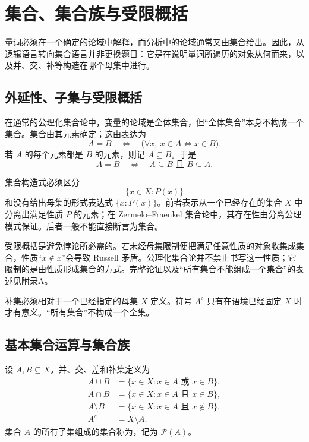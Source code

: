 \section{集合、集合族与受限概括}

量词必须在一个确定的论域中解释，而分析中的论域通常又由集合给出。因此，从逻辑语言转向集合语言并非更换题目：它是在说明量词所遍历的对象从何而来，以及并、交、补等构造在哪个母集中进行。

\subsection{外延性、子集与受限概括}

在通常的公理化集合论中，变量的论域是全体集合，但“全体集合”本身不构成一个集合。集合由其元素确定；这由表达为
\[
  A=B\quad\Longleftrightarrow\quad
  \bigl(\forall x,\ x\in A\Leftrightarrow x\in B\bigr).
\]
若 \(A\) 的每个元素都是 \(B\) 的元素，则记 \(A\subseteq B\)。于是
\[
  A=B\quad\Longleftrightarrow\quad A\subseteq B\text{ 且 }B\subseteq A.
\]

集合构造式必须区分
\[
  \{x\in X:P(x)\}
\]
和没有给出母集的形式表达式 \(\{x:P(x)\}\)。前者表示从一个已经存在的集合 \(X\) 中分离出满足性质 \(P\) 的元素；在 Zermelo--Fraenkel 集合论中，其存在性由分离公理模式保证。后者一般不能直接断言为集合。

受限概括是避免悖论所必需的。若未经母集限制便把满足任意性质的对象收集成集合，性质“\(x\notin x\)”会导致 Russell 矛盾。公理化集合论并不禁止书写这一性质；它限制的是由性质形成集合的方式。完整论证以及“所有集合不能组成一个集合”的表述见附录A。

\begin{warningbox}[不存在默认的全集]
补集必须相对于一个已经指定的母集 \(X\) 定义。符号 \(A^c\) 只有在语境已经固定 \(X\) 时才有意义。“所有集合”不构成一个全集。
\end{warningbox}

\subsection{基本集合运算与集合族}

设 \(A,B\subseteq X\)。并、交、差和补集定义为
\[
\begin{aligned}
 A\cup B&=\{x\in X:x\in A\text{ 或 }x\in B\},\\
 A\cap B&=\{x\in X:x\in A\text{ 且 }x\in B\},\\
 A\setminus B&=\{x\in X:x\in A\text{ 且 }x\notin B\},\\
 A^c&=X\setminus A.
\end{aligned}
\]
集合 \(A\) 的所有子集组成的集合称为，记为 \(\mathcal P(A)\)。

